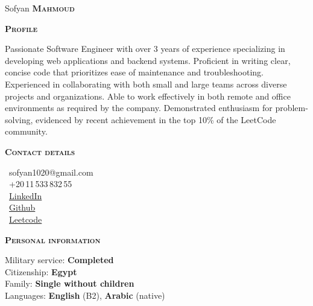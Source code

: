 \documentclass[11pt, a4paper]{article}
\newcommand{\headleft}[1]{\vspace*{3ex}\textsc{\textbf{#1}}\par%
    \vspace*{-1.5ex}\hrulefill\par\vspace*{0.7ex}}
\begin{document}
\setlength{\topskip}{0pt}
\setlength{\parindent}{0pt}
\setlength{\parskip}{0pt}
\setlength{\fboxsep}{0pt}
\pagestyle{empty}
\raggedbottom

\begin{minipage}[t]{0.33\textwidth} %
\colorbox{secondColor}{\begin{minipage}[t][5mm][t]{\textwidth}\null\hfill\null\end{minipage}}

\vspace{-.2ex} %
\colorbox{secondColor!90}{\color{white}  %
\textwidth\relax%
\begin{minipage}[t][293mm][t]{0.82\textwidth}
\raggedright
\vspace*{2.5ex}

\Large \centerline{Sofyan \textbf{\textsc{Mahmoud}}} \normalsize 


\vspace*{0.5ex} %

\headleft{Profile}
Passionate Software Engineer with over 3 years of experience specializing in developing web applications and backend systems. 
Proficient in writing clear, concise code that prioritizes ease of maintenance and troubleshooting. 
Experienced in collaborating with both small and large teams across diverse projects and organizations. 
Able to work effectively in both remote and office environments as required by the company. 
Demonstrated enthusiasm for problem-solving, evidenced by recent achievement in the top 10\% of the LeetCode community.

\headleft{Contact details}
\small %
\Letter\ {\small sofyan1020@gmail.com} \\[0.4ex]
\faMobile\ +20\,11\,533\,832\,55 \\[0.5ex]
\faLinkedin\ \href{https://www.linkedin.com/in/sofyanmahmoud0000/}{LinkedIn} \\[0.1ex]
\faGithub\ \href{https://github.com/sofyanmahmoud0000}{Github} \\[0.1ex]
\faAt\ \href{https://leetcode.com/sofyan1020/}{Leetcode} \\[0.1ex]
\normalsize

\headleft{Personal information}
Military service: \textbf{Completed} \\
Citizenship: \textbf{Egypt} \\[0.5ex]
Family: \textbf{Single without children} \\[0.5ex]
Languages: \textbf{English} (B2), \textbf{Arabic} (native)

\end{minipage}%
\textwidth\relax%
}
\end{minipage}%
\end{document}
